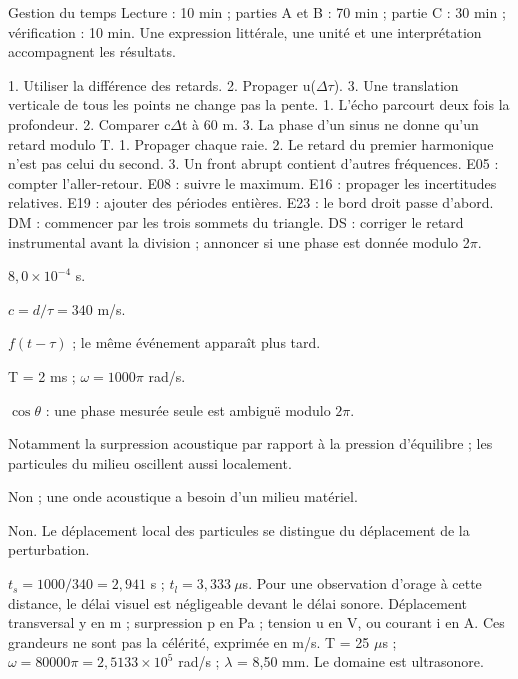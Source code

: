 \begin{docu}{Gestion du temps}
Lecture : 10 min ; parties A et B : 70 min ; partie C : 30 min ; vérification : 10 min. Une expression littérale, une unité et une interprétation accompagnent les résultats.
\end{docu}


1. Utiliser la différence des retards. 2. Propager u(\ensuremath{\Delta}\ensuremath{\tau}). 3. Une translation verticale de tous les points ne change pas la pente.
1. L’écho parcourt deux fois la profondeur. 2. Comparer c\ensuremath{\Delta}t à 60 m. 3. La phase d’un sinus ne donne qu’un retard modulo T.
1. Propager chaque raie. 2. Le retard du premier harmonique n’est pas celui du second. 3. Un front abrupt contient d’autres fréquences.
E05 : compter l’aller-retour. E08 : suivre le maximum. E16 : propager les incertitudes relatives. E19 : ajouter des périodes entières. E23 : le bord droit passe d’abord.
DM : commencer par les trois sommets du triangle. DS : corriger le retard instrumental avant la division ; annoncer si une phase est donnée modulo 2\ensuremath{\pi}.


$8{,}0\times10^{-4}$ s.

$c=d/\tau=340$ m/s.

$f(t-\tau)$ ; le même événement apparaît plus tard.

T = 2 ms ; $\omega=1000\pi$ rad/s.

$\cos\theta$ : une phase mesurée seule est ambiguë modulo $2\pi$.

Notamment la surpression acoustique par rapport à la pression d’équilibre ; les particules du milieu oscillent aussi localement.

Non ; une onde acoustique a besoin d’un milieu matériel.

Non. Le déplacement local des particules se distingue du déplacement de la perturbation.


$t_s=1000/340=2{,}941$ s ; $t_l=3{,}333\ \mu$s. Pour une observation d’orage à cette distance, le délai visuel est négligeable devant le délai sonore.
Déplacement transversal y en m ; surpression p en Pa ; tension u en V, ou courant i en A. Ces grandeurs ne sont pas la célérité, exprimée en m/s.
T = 25 $\mu$s ; $\omega=80000\pi=2{,}5133\times10^5$ rad/s ; \ensuremath{\lambda} = 8,50 mm. Le domaine est ultrasonore.


